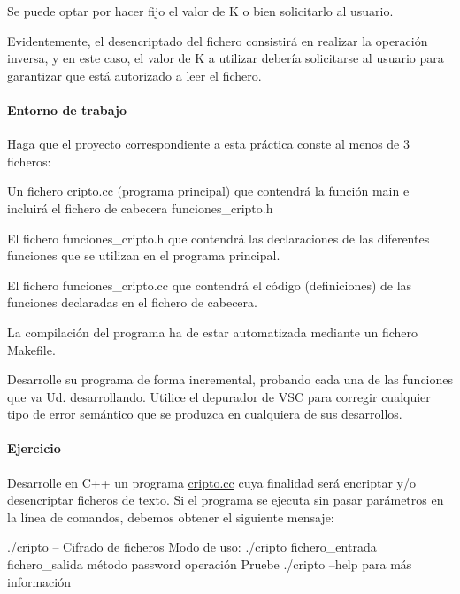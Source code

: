 Se puede optar por hacer fijo el valor de K o bien solicitarlo al usuario.

Evidentemente, el desencriptado del fichero consistirá en realizar la operación inversa, y en este caso, el valor de K a utilizar debería solicitarse al usuario para garantizar que está autorizado a leer el fichero.

\paragraph*{Entorno de trabajo}

Haga que el proyecto correspondiente a esta práctica conste al menos de 3 ficheros\+:
\begin{DoxyItemize}
\item Un fichero {\ttfamily \hyperlink{cripto_8cc}{cripto.\+cc}} (programa principal) que contendrá la función {\ttfamily main} e incluirá el fichero de cabecera {\ttfamily funciones\+\_\+cripto.\+h}
\item El fichero {\ttfamily funciones\+\_\+cripto.\+h} que contendrá las declaraciones de las diferentes funciones que se utilizan en el programa principal.
\item El fichero {\ttfamily funciones\+\_\+cripto.\+cc} que contendrá el código (definiciones) de las funciones declaradas en el fichero de cabecera.
\end{DoxyItemize}

La compilación del programa ha de estar automatizada mediante un fichero Makefile.

Desarrolle su programa de forma incremental, probando cada una de las funciones que va Ud. desarrollando. Utilice el depurador de V\+SC para corregir cualquier tipo de error semántico que se produzca en cualquiera de sus desarrollos.

\paragraph*{Ejercicio}


\begin{DoxyEnumerate}
\item Desarrolle en C++ un programa {\ttfamily \hyperlink{cripto_8cc}{cripto.\+cc}} cuya finalidad será encriptar y/o desencriptar ficheros de texto. Si el programa se ejecuta sin pasar parámetros en la línea de comandos, debemos obtener el siguiente mensaje\+:
\end{DoxyEnumerate}


\begin{DoxyCode}
./cripto -- Cifrado de ficheros
Modo de uso: ./cripto fichero\_entrada fichero\_salida método password operación
Pruebe ./cripto --help para más información
\end{DoxyCode}


